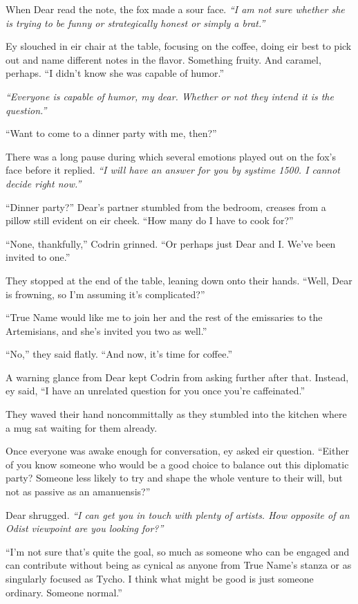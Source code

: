 When Dear read the note, the fox made a sour face. \emph{``I am not sure whether she is trying to be funny or strategically honest or simply a brat.''}

Ey slouched in eir chair at the table, focusing on the coffee, doing eir best to pick out and name different notes in the flavor. Something fruity. And caramel, perhaps. ``I didn't know she was capable of humor.''

\emph{``Everyone is capable of humor, my dear. Whether or not they intend it is the question.''}

``Want to come to a dinner party with me, then?''

There was a long pause during which several emotions played out on the fox's face before it replied. \emph{``I will have an answer for you by systime 1500. I cannot decide right now.''}

``Dinner party?'' Dear's partner stumbled from the bedroom, creases from a pillow still evident on eir cheek. ``How many do I have to cook for?''

``None, thankfully,'' Codrin grinned. ``Or perhaps just Dear and I. We've been invited to one.''

They stopped at the end of the table, leaning down onto their hands. ``Well, Dear is frowning, so I'm assuming it's complicated?''

``True Name would like me to join her and the rest of the emissaries to the Artemisians, and she's invited you two as well.''

``No,'' they said flatly. ``And now, it's time for coffee.''

A warning glance from Dear kept Codrin from asking further after that. Instead, ey said, ``I have an unrelated question for you once you're caffeinated.''

They waved their hand noncommittally as they stumbled into the kitchen where a mug sat waiting for them already.

Once everyone was awake enough for conversation, ey asked eir question. ``Either of you know someone who would be a good choice to balance out this diplomatic party? Someone less likely to try and shape the whole venture to their will, but not as passive as an amanuensis?''

Dear shrugged. \emph{``I can get you in touch with plenty of artists. How opposite of an Odist viewpoint are you looking for?''}

``I'm not sure that's quite the goal, so much as someone who can be engaged and can contribute without being as cynical as anyone from True Name's stanza or as singularly focused as Tycho. I think what might be good is just someone ordinary. Someone normal.''

